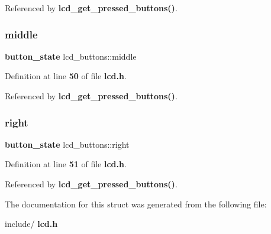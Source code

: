 Referenced by \textbf{ lcd\+\_\+get\+\_\+pressed\+\_\+buttons()}.

\mbox{\label{structlcd__buttons_a293342810ac56f73979b08f144d6e6b9}} 
\subsubsection{middle}
{\footnotesize\ttfamily \textbf{ button\+\_\+state} lcd\+\_\+buttons\+::middle}



Definition at line \textbf{ 50} of file \textbf{ lcd.\+h}.



Referenced by \textbf{ lcd\+\_\+get\+\_\+pressed\+\_\+buttons()}.

\mbox{\label{structlcd__buttons_a2437d744e09ca1bb91ab4ca53ef77198}} 
\subsubsection{right}
{\footnotesize\ttfamily \textbf{ button\+\_\+state} lcd\+\_\+buttons\+::right}



Definition at line \textbf{ 51} of file \textbf{ lcd.\+h}.



Referenced by \textbf{ lcd\+\_\+get\+\_\+pressed\+\_\+buttons()}.



The documentation for this struct was generated from the following file\+:\begin{DoxyCompactItemize}
\item 
include/\textbf{ lcd.\+h}\end{DoxyCompactItemize}
